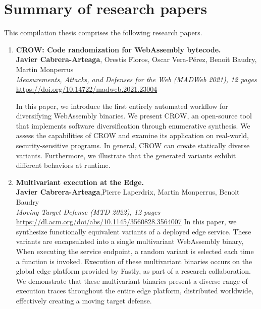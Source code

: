 \section{Summary of research papers}

This compilation thesis comprises the following research papers.

\begin{enumerate}[label={\textbf{P\arabic*}:}, ref={P\arabic*}]
	\item \label{crowpaper} \textbf{CROW: Code randomization for WebAssembly bytecode.} \\ 
	\textbf{Javier Cabrera-Arteaga}, Orestis Floros, Oscar Vera-Pérez, Benoit Baudry, Martin Monperrus\\
	\textit{ Measurements, Attacks, and Defenses for the Web (MADWeb 2021), 12 pages} \\
	\url{https://doi.org/10.14722/madweb.2021.23004}
	
	 In this paper, we introduce the first entirely automated workflow for diversifying WebAssembly binaries. 
	We present CROW, an open-source tool that implements software diversification through enumerative synthesis. 
	We assess the capabilities of CROW and examine its application on real-world, security-sensitive programs.
	In general, CROW can create statically diverse variants. 
	Furthermore, we illustrate that the generated variants exhibit different behaviors at runtime.

	
	
	\item \label{mewepaper} \textbf{Multivariant execution at the Edge. } \\
	\textbf{Javier Cabrera-Arteaga},Pierre Laperdrix, Martin Monperrus, Benoit Baudry\\
    \textit{Moving Target Defense (MTD 2022), 12 pages} \\
    \url{https://dl.acm.org/doi/abs/10.1145/3560828.3564007} 
	In this paper, we synthesize functionally equivalent variants of a deployed edge service. 
	These variants are encapsulated into a single multivariant WebAssembly binary, 
	When executing the service endpoint, a random variant is selected each time a function is invoked.
	Execution of these multivariant binaries occurs on the global edge platform provided by Fastly, as part of a research collaboration. 
	We demonstrate that these multivariant binaries present a diverse range of execution traces throughout the entire edge platform, distributed worldwide, effectively creating a moving target defense.


\end{enumerate}
